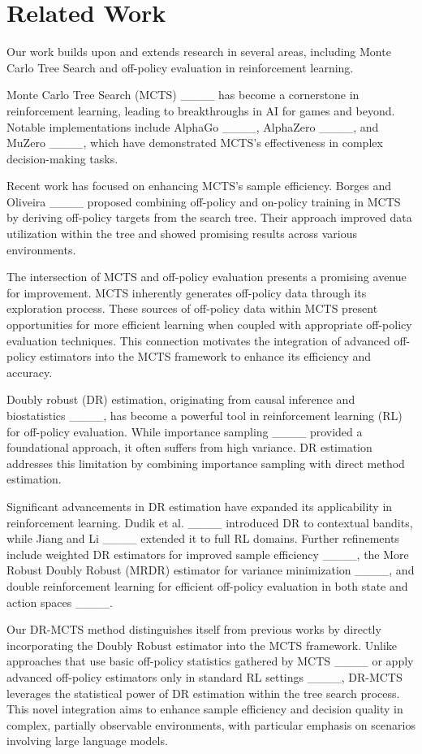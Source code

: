 \section{Related Work}
Our work builds upon and extends research in several areas, including Monte Carlo Tree Search and off-policy evaluation in reinforcement learning.

Monte Carlo Tree Search (MCTS) ____ has become a cornerstone in reinforcement learning, leading to breakthroughs in AI for games and beyond. Notable implementations include AlphaGo ____, AlphaZero ____, and MuZero ____, which have demonstrated MCTS's effectiveness in complex decision-making tasks.

Recent work has focused on enhancing MCTS's sample efficiency. Borges and Oliveira ____ proposed combining off-policy and on-policy training in MCTS by deriving off-policy targets from the search tree. Their approach improved data utilization within the tree and showed promising results across various environments.

The intersection of MCTS and off-policy evaluation presents a promising avenue for improvement. MCTS inherently generates off-policy data through its exploration process. These sources of off-policy data within MCTS present opportunities for more efficient learning when coupled with appropriate off-policy evaluation techniques. This connection motivates the integration of advanced off-policy estimators into the MCTS framework to enhance its efficiency and accuracy.

Doubly robust (DR) estimation, originating from causal inference and biostatistics ____, has become a powerful tool in reinforcement learning (RL) for off-policy evaluation. While importance sampling ____ provided a foundational approach, it often suffers from high variance. DR estimation addresses this limitation by combining importance sampling with direct method estimation.

Significant advancements in DR estimation have expanded its applicability in reinforcement learning. Dudik et al. ____ introduced DR to contextual bandits, while Jiang and Li ____ extended it to full RL domains. Further refinements include weighted DR estimators for improved sample efficiency ____, the More Robust Doubly Robust (MRDR) estimator for variance minimization ____, and double reinforcement learning for efficient off-policy evaluation in both state and action spaces ____.

Our DR-MCTS method distinguishes itself from previous works by directly incorporating the Doubly Robust estimator into the MCTS framework. Unlike approaches that use basic off-policy statistics gathered by MCTS ____ or apply advanced off-policy estimators only in standard RL settings ____, DR-MCTS leverages the statistical power of DR estimation within the tree search process. This novel integration aims to enhance sample efficiency and decision quality in complex, partially observable environments, with particular emphasis on scenarios involving large language models.


